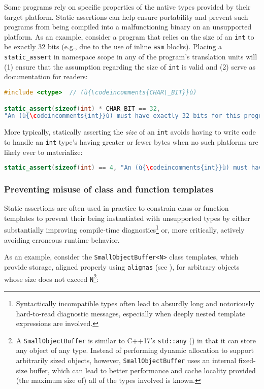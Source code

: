 Some programs rely on specific properties of the native types provided
by their target platform. Static assertions can help ensure portability
and prevent such programs from being compiled into a malfunctioning
binary on an unsupported platform. As an example, consider a
program that relies on the size of an \lstinline!int! to be exactly 32
bits (e.g., due to the use of inline \lstinline!asm! blocks). Placing a
\lstinline!static_assert! in namespace scope in any of the program's
translation units will (1) ensure that the assumption regarding the size
of \lstinline!int! is valid and (2) serve as documentation for readers:

\begin{lstlisting}[language=C++]
#include <ctype>  // (ù{\codeincomments{CHAR\_BIT}}ù)

static_assert(sizeof(int) * CHAR_BIT == 32,
"An (ù{\codeincomments{int}}ù) must have exactly 32 bits for this program to work correctly.");
\end{lstlisting}

\noindent More typically, statically asserting the \emph{size} of an \lstinline!int!
avoids having to write code to handle an \lstinline!int! type's having
greater or fewer bytes when no such platforms are likely ever to
materialize:

\begin{lstlisting}[language=C++]
static_assert(sizeof(int) == 4, "An (ù{\codeincomments{int}}ù) must have exactly 4 bytes.");
\end{lstlisting}


\subsubsection[Preventing misuse of class and function templates]{Preventing misuse of class and function templates}\label{preventing-misuse-of-class-and-function-templates}

Static assertions are often used in practice to constrain class or
function templates to prevent their being instantiated with unsupported
types by either substantially improving compile-time
diagnostics{\cprotect\footnote{Syntactically incompatible types often
lead to absurdly long and notoriously hard-to-read diagnostic messages, especially when deeply nested template expressions are involved.}} or, more critically, actively avoiding
erroneous runtime behavior.

As an example, consider the \lstinline!SmallObjectBuffer<N>! class
templates, which provide storage, aligned properly using \lstinline!alignas! (see
),
for arbitrary objects whose size does
not exceed \lstinline!N!{\cprotect\footnote{A \lstinline!SmallObjectBuffer! is
similar to C++17's \lstinline!std::any! (\cite{cpprefstdany}) in
that it can store any object of any type. Instead of performing
dynamic allocation to support arbitrarily sized objects, however,
\lstinline!SmallObjectBuffer! uses an internal fixed-size buffer, which
can lead to better performance and cache locality provided (the
maximum size of) all of the types involved is known.}}:

